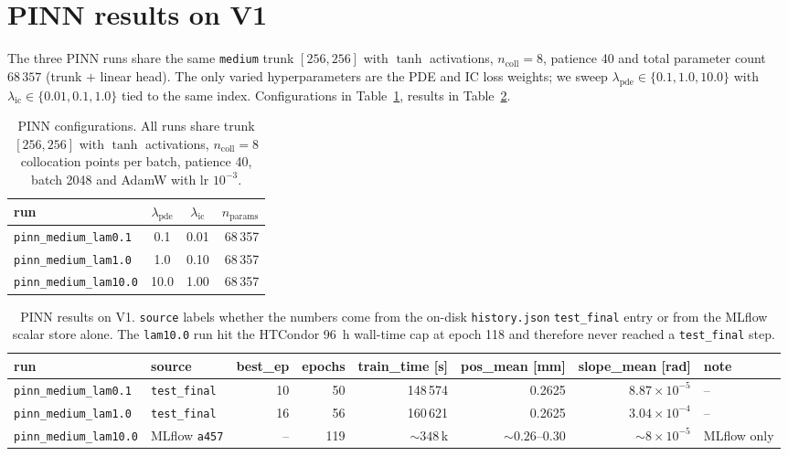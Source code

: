 \documentclass[a4paper,11pt]{article}
\newcommand{\SI}[2]{#1~#2}
\begin{document}
\section{PINN results on V1}\label{gen2old:sec:pinn}

The three PINN runs share the same \texttt{medium} trunk
$[256,256]$ with $\tanh$ activations, $n_{\mathrm{coll}}=8$, patience 40 and
total parameter count $68\,357$ (trunk $+$ linear head). The only varied
hyperparameters are the PDE and IC loss weights; we sweep
$\lambda_{\mathrm{pde}}\in\{0.1,1.0,10.0\}$ with
$\lambda_{\mathrm{ic}}\in\{0.01,0.1,1.0\}$ tied to the same index.
Configurations in Table~\ref{gen2old:tab:pinn_cfg}, results in
Table~\ref{gen2old:tab:pinn_res}.

\begin{table}[h]
\centering\small
\caption{PINN configurations. All runs share trunk $[256,256]$ with
$\tanh$ activations, $n_{\mathrm{coll}}=8$ collocation points per batch,
patience 40, batch 2048 and AdamW with lr $10^{-3}$.}
\label{gen2old:tab:pinn_cfg}
\begin{tabular}{lccr}
\toprule
run & $\lambda_{\mathrm{pde}}$ & $\lambda_{\mathrm{ic}}$ & $n_{\mathrm{params}}$\\
\midrule
\texttt{pinn\_medium\_lam0.1}  & 0.1  & 0.01 & 68\,357\\
\texttt{pinn\_medium\_lam1.0}  & 1.0  & 0.10 & 68\,357\\
\texttt{pinn\_medium\_lam10.0} & 10.0 & 1.00 & 68\,357\\
\bottomrule
\end{tabular}
\end{table}

\begin{table}[h]
\centering\small
\caption{PINN results on V1. \texttt{source} labels whether the numbers come
from the on-disk \texttt{history.json} \texttt{test\_final} entry or from the
MLflow scalar store alone. The \texttt{lam10.0} run hit the HTCondor
\SI{96}{h} wall-time cap at epoch 118 and therefore never reached a
\texttt{test\_final} step.}
\label{gen2old:tab:pinn_res}
\begin{tabular}{llrrrrrl}
\toprule
run & source & best\_ep & epochs & train\_time [s]
    & pos\_mean [mm] & slope\_mean [rad] & note\\
\midrule
\texttt{pinn\_medium\_lam0.1}  & \texttt{test\_final} & 10 &  50 & 148\,574 & 0.2625 & $8.87\!\times\!10^{-5}$ & --\\
\texttt{pinn\_medium\_lam1.0}  & \texttt{test\_final} & 16 &  56 & 160\,621 & 0.2625 & $3.04\!\times\!10^{-4}$ & --\\
\texttt{pinn\_medium\_lam10.0} & MLflow \texttt{a457} & -- & 119 & ${\sim}348$\,k & ${\sim}0.26$--$0.30$ & ${\sim}8\!\times\!10^{-5}$ & MLflow only\\
\bottomrule
\end{tabular}
\end{table}
\end{document}
